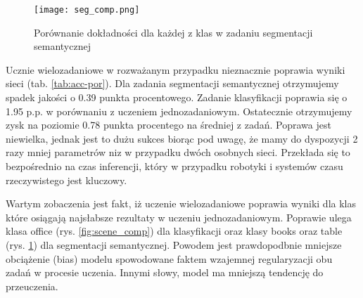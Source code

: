 \begin{figure}[ht!]
    \centering
    \texttt{[image: seg\_comp.png]}
    \caption{Porównanie dokładności dla każdej z klas w zadaniu segmentacji semantycznej}
    \label{fig:seg_comp}
\end{figure}
Ucznie wielozadaniowe w rozważanym przypadku nieznacznie poprawia wyniki sieci (tab. \ref{tab:acc-por}). Dla zadania segmentacji semantycznej otrzymujemy spadek jakości o 0.39 punkta procentowego. Zadanie klasyfikacji poprawia się o 1.95 p.p. w porównaniu z uczeniem jednozadaniowym. Ostatecznie otrzymujemy zysk na poziomie 0.78 punkta procentego na średniej z zadań. Poprawa jest niewielka, jednak jest to dużu sukces biorąc pod uwagę, że mamy do dyspozycji 2 razy mniej parametrów niz w przypadku dwóch osobnych sieci. Przekłada się to bezpośrednio na czas inferencji, który w przypadku robotyki i systemów czasu rzeczywistego jest kluczowy.

Wartym zobaczenia jest fakt, iż uczenie wielozadaniowe poprawia wyniki dla klas które osiągają najsłabsze rezultaty w uczeniu jednozadaniowym. Poprawie ulega klasa office (rys. \ref{fig:scene_comp}) dla klasyfikacji oraz klasy books oraz table (rys. \ref{fig:seg_comp}) dla segmentacji semantycznej. Powodem jest prawdopodbnie mniejsze obciążenie (bias) modelu spowodowane faktem wzajemnej regularyzacji obu zadań w procesie uczenia. Innymi słowy, model ma mniejszą tendencję do przeuczenia.